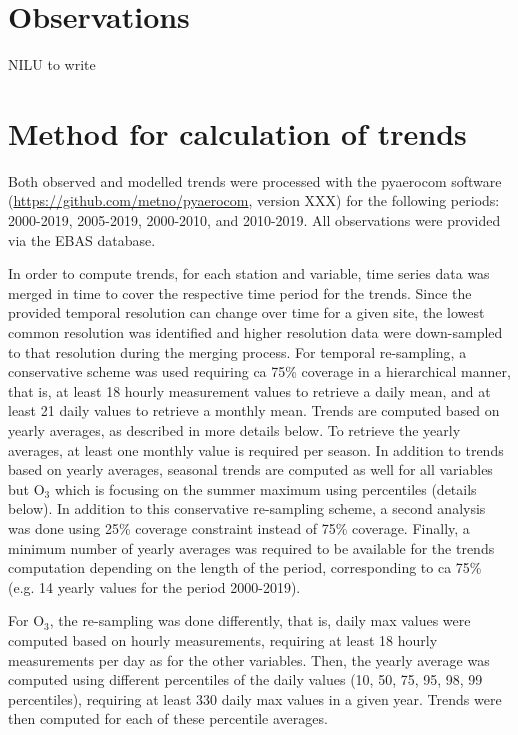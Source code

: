 \section{\label{OBSTrends}{Observations}} NILU to write

\section{\label{Method}{Method for calculation of trends}}
Both observed and modelled trends were processed with the pyaerocom software (\url{https://github.com/metno/pyaerocom}, version XXX) for the following periods: 2000-2019, 2005-2019, 2000-2010, and 2010-2019. All observations were provided via the EBAS database. 

In order to compute trends, for each station and variable, time series data was merged in time to cover the respective time period for the trends.
Since the provided temporal resolution can change over time for a given site, the lowest common resolution was identified and higher resolution data were down-sampled to that resolution during the merging process. For temporal re-sampling, a conservative scheme was used requiring ca 75\% coverage in a hierarchical manner, that is, at least 18 hourly measurement values to retrieve a daily mean, and at least 21 daily values to retrieve a monthly mean. Trends are computed based on yearly averages, as described in more details below. To retrieve the yearly averages, at least one monthly value is required per season. In addition to trends based on yearly averages, seasonal trends are computed as well for all variables but O$_{3}$ which is focusing on the summer maximum using percentiles (details below). In addition to this conservative re-sampling scheme, a second analysis was done using 25\% coverage constraint instead of 75\% coverage. Finally, a minimum number of yearly averages was required to be available for the trends computation depending on the length of the period, corresponding to ca 75\% (e.g. 14 yearly values for the period 2000-2019).

For O$_3$, the re-sampling was done differently, that is, daily max values were computed based on hourly measurements, requiring at least 18 hourly measurements per day as for the other variables. Then, the yearly average was computed using different percentiles of the daily values (10, 50, 75, 95, 98, 99 percentiles), requiring at least 330 daily max values in a given year. Trends were then computed for each of these percentile averages.

